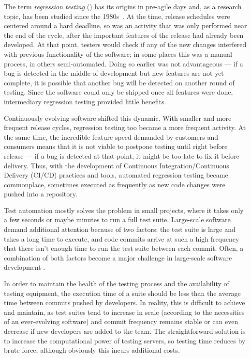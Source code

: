 The term \textit{regression testing} (\rt) has its origins in pre-agile days and, as a research topic, has been studied since the 1980s~\cite{leung1989insights,yoo2012regression}.
At the time, release schedules were centered around a hard deadline, so \rt was an activity that was only performed near the end of the cycle, after the important features of the release had already been developed.
At that point, testers would check if any of the new changes interfered with previous functionality of the software; in some places this was a manual process, in others semi-automated.
Doing so earlier was not advantageous --- if a bug is detected in the middle of development but new features are not yet complete, it is possible that another bug will be detected on another round of testing.
Since the software could only be shipped once all features were done, intermediary regression testing provided little benefits.

Continuously evolving software shifted this dynamic.
With smaller and more frequent release cycles, regression testing too became a more frequent activity.
At the same time, the incredible feature speed demanded by customers and consumers means that it is not viable to postpone testing until right before release --- if a bug is detected at that point, it might be too late to fix it before delivery.
Thus, with the development of Continuous Integration/Continuous Delivery (CI/CD) practices and tools, automated regression testing became commonplace, sometimes executed as frequently as new code changes were pushed into a repository.

Test automation mostly solves the problem in small projects, where it takes only a few seconds or maybe minutes to run a full test suite.
Large-scale software demand additional attention because of two factors: the test suite is large and takes a long time to execute, and code commits arrive at such a high frequency that there isn't enough time to run the test suite between each commit.
Often, a combination of both factors become a major challenge in large-scale software development \cite{memon_taming_2017}.

In order to maintain the health of the testing process and the availability of testing equipment, the execution time of a suite should be less than the average time between commits pushed by developers.
In reality, this is difficult to achieve and maintain, as test suites tend to increase in scale (according to the necessities of an ever-evolving software) and commit frequency remains stable or can even decrease if new developers are added to the team.
The straightforward solution is to increase the computational power of testing servers, so testing time reduces by brute force, although obviously this incurs additional costs.

